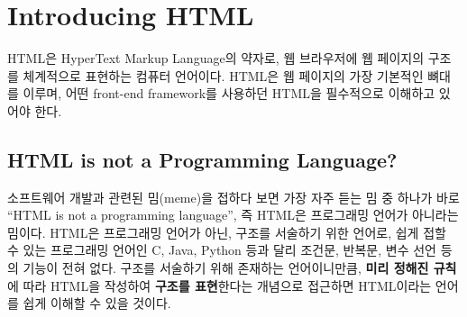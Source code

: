 \section{Introducing HTML} \label{sect:introducing-html}

HTML은 HyperText Markup Language의 약자로, 웹 브라우저에 웹 페이지의 구조를 체계적으로 표현하는 컴퓨터 언어이다. HTML은 웹 페이지의 가장 기본적인 뼈대를 이루며, 어떤 front-end framework를 사용하던 HTML을 필수적으로 이해하고 있어야 한다.

\subsection*{HTML is not a Programming Language?}

소프트웨어 개발과 관련된 밈(meme)을 접하다 보면 가장 자주 듣는 밈 중 하나가 바로 ``HTML is not a programming language'', 즉 HTML은 프로그래밍 언어가 아니라는 밈이다. HTML은 프로그래밍 언어가 아닌, 구조를 서술하기 위한 언어로, 쉽게 접할 수 있는 프로그래밍 언어인 C, Java, Python 등과 달리 조건문, 반복문, 변수 선언 등의 기능이 전혀 없다. 구조를 서술하기 위해 존재하는 언어이니만큼, \textbf{미리 정해진 규칙}에 따라 HTML을 작성하여 \textbf{구조를 표현}한다는 개념으로 접근하면 HTML이라는 언어를 쉽게 이해할 수 있을 것이다.

    {}
